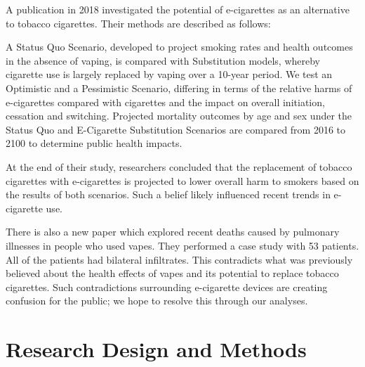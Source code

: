 \documentclass[article]{article}
\begin{document}
\medskip

A publication in 2018 investigated the potential of e-cigarettes as an alternative to tobacco cigarettes. \cite{Levy18}
Their methods are described as follows:

\begin{displayquote}
A Status Quo Scenario, developed to project smoking rates and health outcomes in the absence of vaping, is compared with Substitution models, whereby cigarette use is largely replaced by vaping over a 10-year period. We test an Optimistic and a Pessimistic Scenario, differing in terms of the relative harms of e-cigarettes compared with cigarettes and the impact on overall initiation, cessation and switching. Projected mortality outcomes by age and sex under the Status Quo and E-Cigarette Substitution Scenarios are compared from 2016 to 2100 to determine public health impacts.
\end{displayquote}

\noindent
At the end of their study, researchers concluded that the replacement of tobacco cigarettes with e-cigarettes is projected to lower overall harm to smokers based on the results of both scenarios. Such a belief likely influenced recent trends in e-cigarette use.

\medskip

There is also a new paper \cite{doi:10.1056/NEJMoa1911614} which explored recent deaths caused by pulmonary illnesses in people who used vapes. They performed a case study with 53 patients. All of the patients had bilateral infiltrates. This contradicts what was previously believed about the health effects of vapes and its potential to replace tobacco cigarettes. Such contradictions surrounding e-cigarette devices are creating confusion for the public; we hope to resolve this through our analyses.

\medskip

\section{Research Design and Methods}
\end{document}
